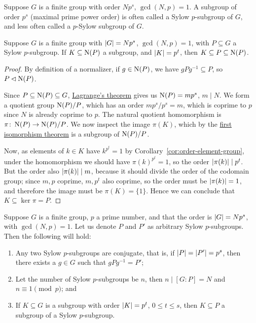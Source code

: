 \begin{definition}
    Suppose \(G\) is a finite group with order \(Np^s\), \(\gcd(N,p) = 1\).
    A subgroup of order \(p^s\) (maximal prime power order)
    is often called a Sylow \(p\)-subgroup of \(G\),
    and less often called a \(p\)-Sylow subgroup of \(G\).
\end{definition}
\begin{lemma}\label{lem:prime-power-sylow-subgroup}
    Suppose \(G\) is a finite group with \(\abs{G} = Np^s\), \(\gcd(N,p) = 1\),
    with \(P \subseteq G\) a Sylow \(p\)-subgroup.
    If \(K \subseteq \operatorname{N}(P)\) a subgroup, and \(\abs{K} = p^t\),
    then \(K \subseteq P \subseteq \operatorname{N}(P)\).
\end{lemma}
\begin{proof}
    By definition of a normalizer, if \(g \in \operatorname{N}(P)\),
    we have \(gPg^{-1} \subseteq P\), so \(P \lhd \operatorname{N}(P)\).

    Since \(P \subseteq \operatorname{N}(P) \subseteq G\),
    \hyperref[thm:lagrange]{Lagrange's theorem} gives us
    \(\operatorname{N}(P) = mp^s\), \(m \mid N\).
    We form a quotient group \(\operatorname{N}(P)/P\),
    which has an order \(mp^s/p^s = m\), which is coprime to \(p\)
    since \(N\) is already coprime to \(p\).
    The natural quotient homomorphism is
    \(\pi\colon\operatorname{N}(P)\to\operatorname{N}(P)/P\).
    We now inspect the image \(\pi(K)\),
    which by the \hyperref[thm:iso-1-group]{first isomorphism theorem}
    is a subgroup of \(\operatorname{N}(P)/P\).

    Now, as elements of \(k \in K\) have \(k^{p^t} = 1\)
    by Corollary~\ref{cor:order-element-group},
    under the homomorphism we should have \({\pi(k)}^{p^t} = 1\),
    so the order \(\abs{\pi(k)} \mid p^t\).
    But the order also \(\abs{\pi(k)} \mid m\),
    because it should divide the order of the codomain group;
    since \(m,p\) coprime, \(m,p^t\) also coprime,
    so the order must be \(\abs{\pi(k)} = 1\),
    and therefore the image must be \(\pi(K) = \{1\}\).
    Hence we can conclude that \(K \subseteq \ker\pi = P\).
\end{proof}
\begin{theorem}\label{thm:sylow-2}
    Suppose \(G\) is a finite group, \(p\) a prime number,
    and that the order is \(\abs{G} = Np^s\), with \(\gcd(N,p) = 1\).
    Let us denote \(P\) and \(P'\) as arbitrary Sylow \(p\)-subgroups.
    Then the following will hold:
    \begin{enumerate}[label={(\alph*)}, itemsep=0mm]
        \item Any two Sylow \(p\)-subgroups are conjugate,
            that is, if \(\abs{P} = \abs{P'} = p^s\),
            then there exists a \(g \in G\) such that \(gPg^{-1} = P'\);
        \item Let the number of Sylow \(p\)-subgroups be \(n\),
            then \(n \mid [G:P] = N\) and \(n \equiv 1 \pmod{p}\); and
        \item If \(K \subseteq G\) is a subgroup
            with order \(\abs{K} = p^t\), \(0 \leq t \leq s\),
            then \(K \subseteq P\) a subgroup of a Sylow \(p\)-subgroup.
    \end{enumerate}
\end{theorem}
